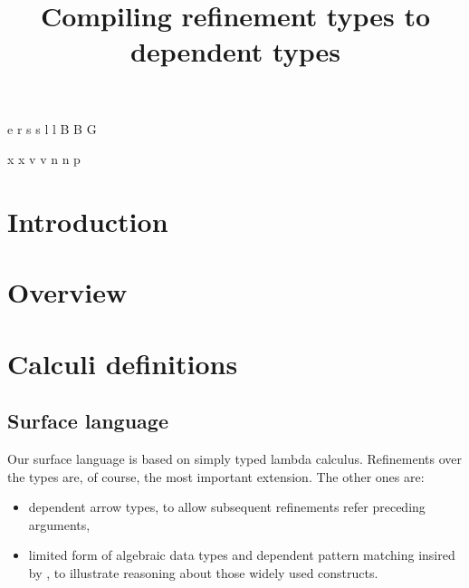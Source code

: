 \documentclass[a4paper]{article}
\begin{document}
\newnonterm e \varepsilon
{}
\newnonterm r \rho
{}
\newnonterm s s
\newnonterm l l
\newnonterm B B
\newnonterm G \Gamma
{}
 \varpi

\newgterm x x
\newgterm v v
\newgterm n n
\newgterm p \pi

\newcommand{\figref}[1]{Figure \ref{fig:#1}}


\title{Compiling refinement types to dependent types}

\maketitle

\section{Introduction}

\section{Overview}


\section{Calculi definitions}

\subsection{Surface language}

Our surface language is based on simply typed lambda calculus.
Refinements over the types are, of course, the most important extension.
The other ones are:
\begin{itemize}
  \item dependent arrow types, to allow subsequent refinements refer preceding arguments,
  \item limited form of algebraic data types and dependent pattern matching
    insired by \cite{TAPLVariants,Eisenberg16},
    to illustrate reasoning about those widely used constructs.
\end{itemize}
\end{document}

